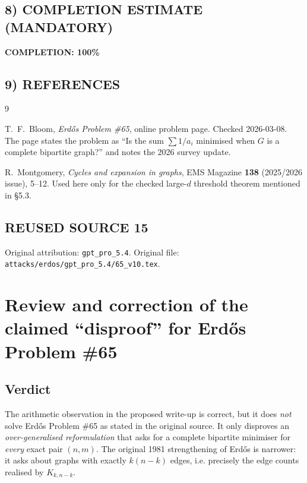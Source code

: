 \subsection*{8) COMPLETION ESTIMATE (MANDATORY)}

\textbf{COMPLETION: 100\%}

\subsection*{9) REFERENCES}

\begin{thebibliography}{9}

T.~F.~Bloom,
\emph{Erd\H{o}s Problem \#65}, online problem page.
Checked 2026-03-08.
The page states the problem as
``Is the sum $\sum 1/a_i$ minimised when $G$ is a complete bipartite graph?''
and notes the 2026 survey update.

R.~Montgomery,
\emph{Cycles and expansion in graphs},
EMS Magazine \textbf{138} (2025/2026 issue), 5--12.
Used here only for the checked large-$d$ threshold theorem mentioned in \S5.3.

\end{thebibliography}


\subsection*{REUSED SOURCE 15}
Original attribution: \texttt{gpt\_pro\_5.4}.
Original file: \texttt{attacks/erdos/gpt\_pro\_5.4/65\_v10.tex}.

\section{Review and correction of the claimed ``disproof'' for Erd\H{o}s Problem \#65}

\subsection*{Verdict}

The arithmetic observation in the proposed write-up is correct, but it does \emph{not} solve Erd\H{o}s Problem \#65 as stated in the original source. It only disproves an \emph{over-generalised reformulation} that asks for a complete bipartite minimiser for \emph{every} exact pair $(n,m)$. The original 1981 strengthening of Erd\H{o}s is narrower: it asks about graphs with exactly $k(n-k)$ edges, i.e. precisely the edge counts realised by $K_{k,n-k}$.

